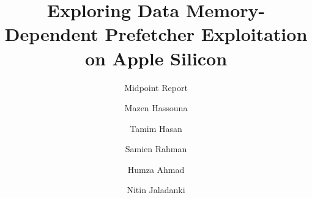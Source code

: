 \documentclass[sigplan,screen,10pt]{acmart}
\begin{document}
\pagestyle{plain}
\title{Exploring Data Memory-Dependent Prefetcher Exploitation on Apple Silicon}
\subtitle{Midpoint Report}
\author{Mazen Hassouna}
\author{Tamim Hasan}
\author{Samien Rahman}
\author{Humza Ahmad}
\author{Nitin Jaladanki}

\maketitle








\end{document}
